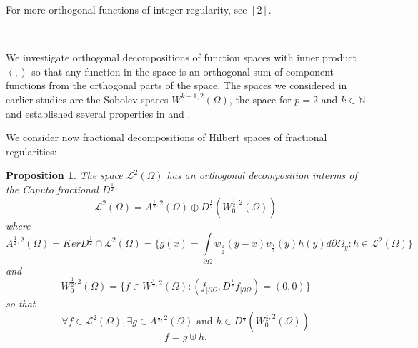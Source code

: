 \documentclass{amsart}%
\providecommand{\U}[1]{\protect\rule{.1in}{.1in}}
\theoremstyle{plain}
\newtheorem{proposition}{Proposition}
\numberwithin{equation}{section}
\begin{document}
For more orthogonal functions of integer regularity, see $[2]$.

\ \ \ \ 

We investigate orthogonal decompositions of function spaces with inner product
$\left\langle ,\right\rangle $ so that any function in the space is an
orthogonal sum of component functions from the orthogonal parts of the space.
The spaces we considered in earlier studies are the Sobolev spaces
$W^{k-1,2}\left(  \Omega\right)  $, the space for $p=2$ and $k\in%
\mathbb{N}
$ and established several properties in \cite{dlakew1} and \cite{dlakew2}.

We consider now fractional decompositions of Hilbert spaces of fractional regularities:

\begin{proposition}
The space $%
\mathcal{L}%
^{2}\left(  \Omega\right)  $ has an orthogonal decomposition interms of the
Caputo fractional $D^{\frac{1}{2}}:$
\begin{equation}%
\mathcal{L}%
^{2}\left(  \Omega\right)  =A^{\frac{1}{2},2}\left(  \Omega\right)  \oplus
D^{\frac{1}{2}}\left(  W_{0}^{\frac{1}{2},2}\left(  \Omega\right)  \right)
\label{decomp1}%
\end{equation}
where
\[
A^{\frac{1}{2},2}\left(  \Omega\right)  =KerD^{\frac{1}{2}}\cap%
\mathcal{L}%
^{2}\left(  \Omega\right)  =\{g(x)=%
{\displaystyle\int\limits_{\partial\Omega}}
\psi_{\frac{1}{2}}\left(  y-x\right)  \upsilon_{\frac{1}{2}}\left(  y\right)
h(y)d\partial\Omega_{y}:h\in%
\mathcal{L}%
^{2}\left(  \Omega\right)  \}
\]
and%
\[
W_{0}^{\frac{1}{2},2}\left(  \Omega\right)  =\{f\in W^{\frac{1}{2},2}\left(
\Omega\right)  :\left(  f_{\mid\partial\Omega},D^{\frac{1}{2}}f_{\mid
\partial\Omega}\right)  =\left(  0,0\right)  \}
\]
so that
\[
\forall f\in%
\mathcal{L}%
^{2}\left(  \Omega\right)  ,\exists g\in A^{\frac{1}{2},2}\left(
\Omega\right)  \text{ \ and \ }h\in D^{\frac{1}{2}}\left(  W_{0}^{\frac{1}%
{2},2}\left(  \Omega\right)  \right)
\]%
\[
f=g\uplus h.
\]

\end{proposition}
\end{document}

